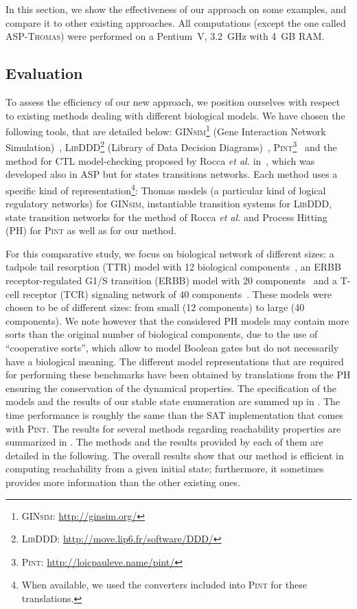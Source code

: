 In this section, we show the effectiveness of our approach on some examples,
and compare it to other existing approaches.
All computations (except the one called \textsc{ASP-Thomas}) were performed on a Pentium~V, 3.2~GHz with 4~GB RAM.

\subsection{Evaluation}
To assess the efficiency of our new approach,
we position ourselves with respect to existing methods dealing with different biological models.
We have chosen the following tools, that are detailed below: 
\textsc{GINsim}\footnote{\textsc{GINsim}: \url{http://ginsim.org/}} (Gene Interaction Network Simulation)~\cite{gonzalez2006ginsim,naldi2009logical,naldi2007decision},
\textsc{LibDDD}\footnote{\textsc{LibDDD}: \url{http://move.lip6.fr/software/DDD/}}
(Library of Data Decision Diagrams)~\cite{thierry2009hierarchical,colange2013towards},
\textsc{Pint}\footnote{\textsc{Pint}: \url{http://loicpauleve.name/pint/}}~\cite{PMR12-MSCS}
and the method for CTL model-checking proposed by Rocca \textit{et al.} in~\cite{roccaasp},
which was developed also in ASP but for states transitions networks.
Each method uses a specific kind of representation\footnote{When available, we used the converters included into \textsc{Pint} for these translations.}:
Thomas models (a particular kind of logical regulatory networks) for \textsc{GINsim},
instantiable transition systems for \textsc{LibDDD},
state transition networks for the method of Rocca \textit{et al.}
and Process Hitting (PH) for \textsc{Pint} as well as for our method.

For this comparative study, we focus on biological network of different sizes:
a tadpole tail resorption (TTR) model with 12 biological components~\cite{khalis2009smbionet},
an ERBB receptor-regulated G1/S transition (ERBB) model with 20 components~\cite{Samaga2009}
and a T-cell receptor (TCR) signaling network of 40 components~\cite{Klamt06}.
These models were chosen to be of different sizes:
from small (12 components) to large (40 components).
We note however that the considered PH models may contain more sorts than
the original number of biological components, due to the use of
``cooperative sorts'', which allow to model Boolean gates but do not necessarily
have a biological meaning.
The different model representations that are required for performing these benchmarks have been obtained by translations
from the PH
ensuring the conservation of the dynamical properties.
The specification of the models and the results of our stable state enumeration
are summed up in .
The time performance is roughly the same than the SAT implementation
that comes with \textsc{Pint}.
The results for several methods regarding reachability properties
are summarized in .
The methods and the results provided by each of them are detailed in the following.
The overall results show that our method is efficient in computing reachability
from a given initial state;
furthermore, it sometimes provides more information than the other existing ones.

